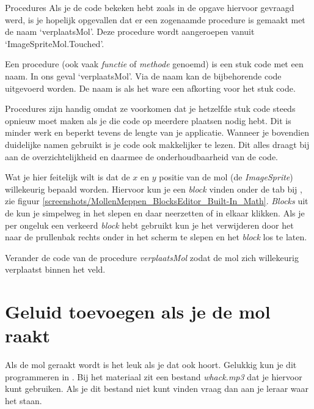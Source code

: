 \begin{derivation}{Procedures}
\label{der:procedures}
Als je de code bekeken hebt zoals in de opgave hiervoor gevraagd werd, is je hopelijk opgevallen dat er een zogenaamde procedure is gemaakt met de naam `verplaatsMol'. Deze procedure wordt aangeroepen vanuit `ImageSpriteMol.Touched'.

Een procedure (ook vaak \emph{functie} of \emph{methode} genoemd) is een stuk code met een naam. In ons geval `verplaatsMol'. Via de naam kan de bijbehorende code uitgevoerd worden. De naam is als het ware een afkorting voor het stuk code.

Procedures zijn handig omdat ze voorkomen dat je hetzelfde stuk code steeds opnieuw moet maken als je die code op meerdere plaatsen nodig hebt. Dit is minder werk en beperkt tevens de lengte van je applicatie. Wanneer je bovendien duidelijke namen gebruikt is je code ook makkelijker te lezen. Dit alles draagt bij aan de overzichtelijkheid en daarmee de onderhoudbaarheid van de code.
\end{derivation}

Wat je hier feitelijk wilt is dat de $x$ en $y$ positie van de mol (de \emph{ImageSprite}) willekeurig bepaald worden. Hiervoor kun je een \emph{block} vinden onder de  tab bij , zie figuur \ref{screenshots/MollenMeppen_BlocksEditor_Built-In_Math}. \emph{Blocks} uit de  kun je simpelweg in het  slepen en daar neerzetten of in elkaar klikken. Als je per ongeluk een verkeerd \emph{block} hebt gebruikt kun je het verwijderen door het naar de prullenbak rechts onder in het scherm te slepen en het \emph{block} los te laten.


\pagebreak
{}
\begin{opgave}
    \opgVraag
	Verander de code van de procedure \emph{verplaatsMol} zodat de mol zich willekeurig verplaatst binnen het veld.
\end{opgave}


\section{Geluid toevoegen als je de mol raakt}
Als de mol geraakt wordt is het leuk als je dat ook hoort. Gelukkig kun je dit programmeren in \ai. Bij het materiaal zit een bestand \emph{whack.mp3} dat je hiervoor kunt gebruiken. Als je dit bestand niet kunt vinden vraag dan aan je leraar waar het staan.

